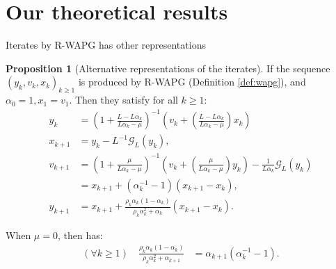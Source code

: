\documentclass[11pt]{beamer}
\theoremstyle{definition}
\newtheorem{proposition}{Proposition}[section]
\begin{document}
\section{Our theoretical results}
    \begin{frame}{Iterates by R-WAPG has other representations}
        \begin{proposition}[Alternative representations of the iterates]\label{prop:wapg-first-equivalent-repr}
            If the sequence $(y_k, v_k, x_k)_{k \ge 1}$ is produced by R-WAPG (Definition \ref{def:wapg}), and $\alpha_0 = 1, x_1 = v_1$. 
            Then they satisfy for all $k\ge 1$: 
            {\footnotesize
            \begin{align}
                y_{k} &=
                \left(
                    1 + \frac{L - L\alpha_{k}}{L\alpha_{k} - \mu}
                \right)^{-1}
                \left(
                    v_{k} +
                    \left(\frac{L - L\alpha_{k}}{L\alpha_{k} - \mu} \right) x_{k}
                \right)
                \\
                x_{k + 1} 
                &=y_k - L^{-1} \mathcal G_L (y_k),
                \\
                v_{k + 1} 
                &=
                \left(
                    1 + \frac{\mu}{L \alpha_k - \mu}
                \right)^{-1}
                \left(
                    v_k +
                    \left(\frac{\mu}{L \alpha_k - \mu}\right) y_k
                \right) - \frac{1}{L\alpha_{k}}\mathcal G_L (y_k)
                \\
                &= 
                x_{k + 1} + (\alpha_k^{-1} - 1)(x_{k + 1} - x_k), 
                \\
                y_{k + 1}
                &= x_{k + 1} +
                \frac{\rho_{k}\alpha_{k}(1 - \alpha_k)}
                {\rho_k\alpha_k^2 + \alpha_k}(x_{k + 1} - x_k). 
            \end{align}
            }
        \end{proposition}
        When $\mu = 0$, then has:
        {\small
        \begin{align*}
            (\forall k \ge 1) \quad
            \frac{\rho_k\alpha_k(1 - \alpha_k)}{\rho_k\alpha_k^2 + \alpha_{k + 1}}
            & = \alpha_{k + 1}(\alpha_k^{-1} - 1).
        \end{align*}
        }
    \end{frame}
\end{document}
